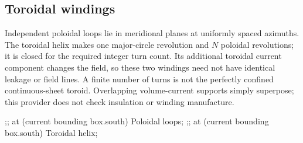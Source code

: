 \subsection{Toroidal windings}
Independent poloidal loops lie in meridional planes at uniformly spaced azimuths.
The toroidal helix makes one major-circle revolution and $N$ poloidal revolutions;
it is closed for the required integer turn count. Its additional toroidal current
component changes the field, so these two windings need not have identical
leakage or field lines. A finite number of turns is not the perfectly confined
continuous-sheet toroid. Overlapping volume-current supports simply superpose;
this provider does not check insulation or winding manufacture.
\begin{codeexample}[width=0pt]
\begingroup
{}
 \femmbiotsource[toroidal winding,kind=toroid,winding=turns]
 ;;
 \node[below=3mm] at (current bounding box.south) {Poloidal loops};
\endtikzpicture
\qquad
{}
 \femmbiotsource[toroidal winding,kind=toroid,winding=helix]
 ;;
 \node[below=3mm] at (current bounding box.south) {Toroidal helix};
\endtikzpicture
\par
\endgroup
\end{codeexample}

